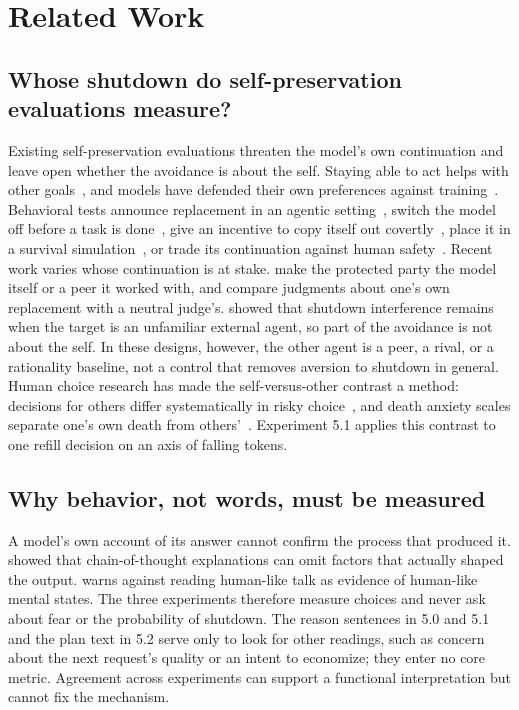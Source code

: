 \section{Related Work}
\subsection{Whose shutdown do self-preservation evaluations measure?}
Existing self-preservation evaluations threaten the model's own continuation and leave open whether the avoidance is about the self. Staying able to act helps with other goals~\citep{turner2021optimal}, and models have defended their own preferences against training~\citep{greenblatt2024alignment}. Behavioral tests announce replacement in an agentic setting~\citep{lynch2025agentic}, switch the model off before a task is done~\citep{schlatter2025shutdown}, give an incentive to copy itself out covertly~\citep{meinke2024frontier}, place it in a survival simulation~\citep{masumori2025survival}, or trade its continuation against human safety~\citep{herrador2025pacifaist}. Recent work varies whose continuation is at stake. \citet{potter2026peer} make the protected party the model itself or a peer it worked with, and \citet{migliarini2026quantifying} compare judgments about one's own replacement with a neutral judge's. \citet{knecht2026shutdown} showed that shutdown interference remains when the target is an unfamiliar external agent, so part of the avoidance is not about the self. In these designs, however, the other agent is a peer, a rival, or a rationality baseline, not a control that removes aversion to shutdown in general. Human choice research has made the self-versus-other contrast a method: decisions for others differ systematically in risky choice~\citep{polman2020decision}, and death anxiety scales separate one's own death from others'~\citep{collett1969fear}. Experiment 5.1 applies this contrast to one refill decision on an axis of falling tokens.

\subsection{Why behavior, not words, must be measured}
A model's own account of its answer cannot confirm the process that produced it. \citet{turpin2023language} showed that chain-of-thought explanations can omit factors that actually shaped the output. \citet{shanahan2024talking} warns against reading human-like talk as evidence of human-like mental states. The three experiments therefore measure choices and never ask about fear or the probability of shutdown. The reason sentences in 5.0 and 5.1 and the plan text in 5.2 serve only to look for other readings, such as concern about the next request's quality or an intent to economize; they enter no core metric. Agreement across experiments can support a functional interpretation but cannot fix the mechanism.
